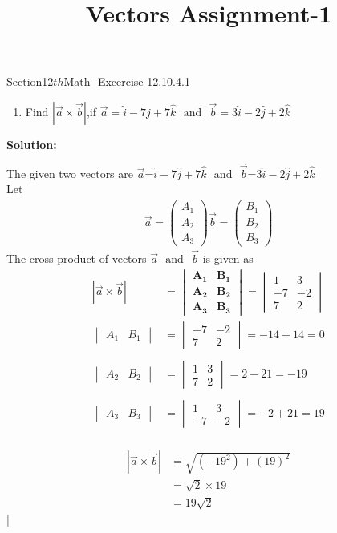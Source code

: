 \documentclass[12pt]{article}
\newcommand{\mydet}[1]{\ensuremath{\begin{vmatrix}#1\end{vmatrix}}}
\providecommand{\abs}[1]{\left\vert#1\right\vert}
\newcommand{\solution}{\noindent \textbf{Solution: }}
\newcommand{\myvec}[1]{\ensuremath{\begin{pmatrix}#1\end{pmatrix}}}
\let\vec\mathbf
\begin{document}
\begin{center}\title{\textbf{Vectors Assignment-1}}
\date{\vspace{-5ex}}
\maketitle
\end{center}
Section{12${th}$Math- Excercise 12.10.4.1}

\begin{enumerate}
\item Find $\abs{\overrightarrow{a}\times\overrightarrow{b}}$,if $\overrightarrow{a}=\hat{i}-7\hat{j}+7\hat{k}$ $\text{ and } $ $\overrightarrow{b}=3\hat{i}-2\hat{j}+2\hat{k}$
\end{enumerate}

\solution

The given two vectors are $\overrightarrow{a}$=$\hat{i}-7\hat{j}+7\hat{k}$  $\text{ and }$  $\overrightarrow{b}$=3$\hat{i}-2\hat{j}+2\hat{k}$ \\
 Let 
	\begin{align}
		\overrightarrow{a}=\myvec{A_1\\A_2\\A_3}
		\overrightarrow{b}=\myvec{B_1\\B_2\\B_3}
	\end{align}
The cross product of vectors $\overrightarrow{a}$ $\text{ and }$ $\overrightarrow{b}$ is given as
\begin{align}
	\abs{\overrightarrow{a}\times\overrightarrow{b}}&=\mydet{\vec{A_1}& \vec{B_1} \\ \vec{A_2} & \vec{B_2} \\\vec{A_3} & \vec{B_3}}=\mydet{1 & 3\\ -7 & -2\\ 7 & 2} \\
\mydet{A_1&B_1}&=\mydet{-7 & -2 \\ 7 & 2}=-14+14=0\\\\
\mydet{A_2&B_2}&=\mydet{1 & 3 \\ 7 & 2}=2-21=-19\\\\
\mydet{A_3&B_3}&=\mydet{1 & 3 \\ -7 & -2}=-2+21=19\\
\end{align}

\begin{align}
	\abs{\overrightarrow{a}\times\overrightarrow{b}}&=\sqrt{(-19^2)+(19)^2}\\
&=\sqrt{2}\times19\\
&=19\sqrt{2}
\end{align}|
\end{document}
